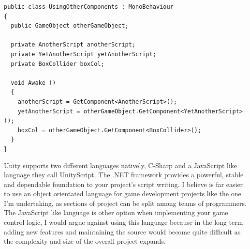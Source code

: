 \begin{verbatim}
public class UsingOtherComponents : MonoBehaviour
{
  public GameObject otherGameObject;

  private AnotherScript anotherScript;
  private YetAnotherScript yetAnotherScript;
  private BoxCollider boxCol;

  void Awake ()
  {
    anotherScript = GetComponent<AnotherScript>();
    yetAnotherScript = otherGameObject.GetComponent<YetAnotherScript>();
    boxCol = otherGameObject.GetComponent<BoxCollider>();
  }
}
\end{verbatim}

Unity supports two different languages natively, C-Sharp and a JavaScript like language they call UnityScript. The .NET framework provides a powerful, stable and dependable foundation to your project's script writing. I believe is far easier to use an object orientated language for game development projects like the one I'm undertaking, as sections of project can be split among teams of programmers. 
The JavaScript like language is other option when implementing your game control logic, I would argue against using this language because in the long term adding new features and maintaining the source would become quite difficult as the complexity and size of the overall project expands.
